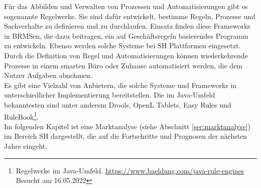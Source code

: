         \linebreak
        Für das Abbilden und Verwalten von Prozessen und Automatisierungen gibt es sogenannte Regelwerke. 
        Sie sind dafür entwickelt, bestimme Regeln, Prozesse und Sachverhalte zu definieren und zu durchlaufen. 
        Einsatz finden diese Frameworks in \ac{BRMS}en, die dazu beitragen, ein auf Geschäftsregeln basierendes Programm zu entwickeln. 
        Ebenso werden solche Systeme bei \acl{SH} Plattformen eingesetzt. Durch die Definition von Regel und Automatisierungen 
        können wiederkehrende Prozesse in einem smarten 
        Büro oder Zuhause automatisiert werden, die dem Nutzer Aufgaben abnehmen.
        \\
        Es gibt eine Vielzahl von Anbietern, die solche Systeme und Frameworks 
        in unterschiedlicher Implementierung bereitstellen. Die im Java-Umfeld bekanntesten sind unter anderem Drools, OpenL Tablets, 
        Easy Rules und RuleBook\footnote{Regelwerke im Java-Umfeld. \url{https://www.baeldung.com/java-rule-engines} Besucht am 16.05.2022}.
        \\
        Im folgenden Kapitel ist eine Marktanalyse (siehe Abschnitt \ref{sec:marktanalyse}) im Bereich \acl{SH} dargestellt, die auf die Fortschritte 
        und Prognosen der nächsten Jahre eingeht.
